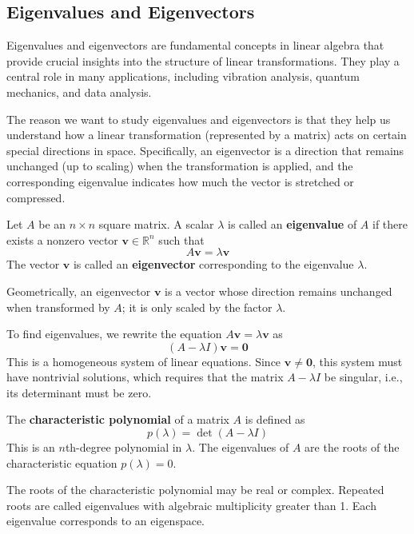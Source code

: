 \subsection{Eigenvalues and Eigenvectors}

Eigenvalues and eigenvectors are fundamental concepts in linear algebra that provide crucial insights into the structure of linear transformations. They play a central role in many applications, including vibration analysis, quantum mechanics, and data analysis.

The reason we want to study eigenvalues and eigenvectors is that they help us understand how a linear transformation (represented by a matrix) acts on certain special directions in space. Specifically, an eigenvector is a direction that remains unchanged (up to scaling) when the transformation is applied, and the corresponding eigenvalue indicates how much the vector is stretched or compressed.

\begin{definition}
Let $A$ be an $n \times n$ square matrix. A scalar $\lambda$ is called an \textbf{eigenvalue} of $A$ if there exists a nonzero vector $\mathbf{v} \in \mathbb{R}^n$ such that
\[
A\mathbf{v} = \lambda \mathbf{v}
\]
The vector $\mathbf{v}$ is called an \textbf{eigenvector} corresponding to the eigenvalue $\lambda$.
\end{definition}

Geometrically, an eigenvector $\mathbf{v}$ is a vector whose direction remains unchanged when transformed by $A$; it is only scaled by the factor $\lambda$.

To find eigenvalues, we rewrite the equation $A\mathbf{v} = \lambda \mathbf{v}$ as
\[
(A - \lambda I)\mathbf{v} = \mathbf{0}
\]
This is a homogeneous system of linear equations. Since $\mathbf{v} \neq \mathbf{0}$, this system must have nontrivial solutions, which requires that the matrix $A - \lambda I$ be singular, i.e., its determinant must be zero.

\begin{definition}
The \textbf{characteristic polynomial} of a matrix $A$ is defined as
\[
p(\lambda) = \det(A - \lambda I)
\]
This is an $n$th-degree polynomial in $\lambda$. The eigenvalues of $A$ are the roots of the characteristic equation $p(\lambda) = 0$.
\end{definition}

The roots of the characteristic polynomial may be real or complex. Repeated roots are called eigenvalues with algebraic multiplicity greater than 1. Each eigenvalue corresponds to an eigenspace.

